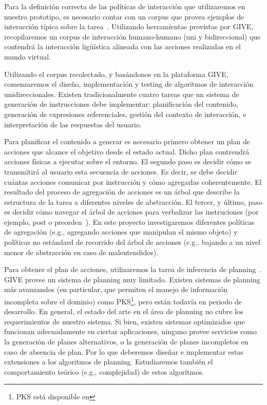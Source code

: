 Para la definici\'on correcta de las pol\'iticas de interacci\'on que
utilizaremos en nuestro prototipo, es necesario
contar con un corpus que provea ejemplos de interacci\'on t\'ipica sobre la
tarea~\citep{HCRC-93, byron-06}.  Utilizando herramientas provistas por GIVE,
recopilaremos un corpus de interacci\'on humano-humano (uni y bidireccional)
que contendr\'a la interacci\'on lig\"u\'istica alineada con las acciones
realizadas en el mundo virtual.

Utilizando el corpus recolectado, y bas\'andonos en la plataforma GIVE,
comenzaremos el dise\~no,
implementaci\'on y testing de algoritmos de interacci\'on unidireccionales.
Existen tradicionalmente cuatro tareas que un sistema de generaci\'on
de instrucciones debe implementar: planificaci\'on del contenido, generaci\'on
de expresiones referenciales, gesti\'on del contexto de interacci\'on, e
interpretaci\'on de las respuestas del usuario.

Para planificar el contenido a generar es necesario primero obtener un plan de
acciones que alcance el objetivo desde el estado actual. Dicho plan contrendr\'a
acciones f\'isicas a ejecutar sobre el entorno. El segundo paso es decidir
c\'omo se transmitir\'a al usuario esta secuencia de acciones. Es decir,
se debe decidir cu\'antas acciones comunicar
por instrucci\'on y c\'omo agregarlas coherentemente. El
resultado del proceso de agregaci\'on de acciones es un \'arbol que describe la
estructura de la tarea a diferentes niveles de abstracci\'on. El tercer, y \'ultimo, paso
es decidir c\'omo navegar el \'arbol de acciones para verbalizar las
instruciones (por ejemplo, post o preorden~\citep{foster-etal-ijcai2009}). En este proyecto investigaremos
diferentes pol\'iticas de agregaci\'on (e.g., agregando acciones que manipulan el mismo
objeto) y pol\'iticas no est\'andard de recorrido del \'arbol de acciones (e.g., bajando a un
nivel menor de abstracci\'on en caso de malentendidos).

Para obtener el plan de acciones, utilizaremos la tarea de inferencia de
planning~\citep{nau04}. GIVE provee un sistema de planning muy
limitado.  Existen sistemas de planning m\'as avanzandos (en particular,
que permiten el manejo de informaci\'on incompleta sobre el dominio)
como PKS\footnote{PKS est\'a disponible en }, pero
est\'an todav\'ia en periodo de desarrollo.  En general, el estado del
arte en el \'area de planning no cubre los requerimientos de nuestro
sistema.  Si bien, existen sistemas optimizados que funcionan adecuadamente
en ciertas aplicaciones, ninguno provee servicios como la generaci\'on de
planes alternativos, o la generaci\'on de planes incompletos en caso de
absencia de plan. Por lo que deberemos dise\~nar e implementar estas
extensiones a los algoritmos de planning. Estudiaremos tambi\'en el
comportamiento te\'orico (e.g., complejidad) de estos algoritmos.

